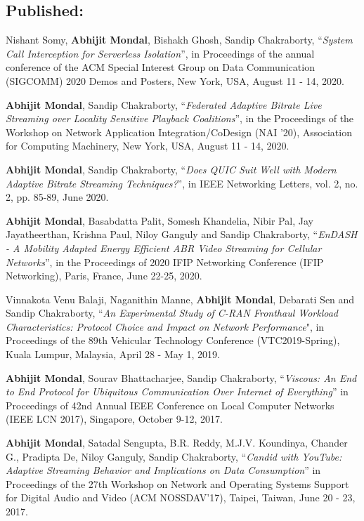 \subsection*{Published:}
\begin{enumerate}[start=1,label={[\arabic*]}]
	\item Nishant Somy, \textbf{Abhijit Mondal}, Bishakh Ghosh, Sandip Chakraborty, ``\textit{System Call Interception for Serverless Isolation}'', in Proceedings of the annual conference of the ACM Special Interest Group on Data Communication (SIGCOMM) 2020 Demos and Posters, New York, USA, August 11 - 14, 2020.
	\item \textbf{Abhijit Mondal}, Sandip Chakraborty, ``\textit{Federated Adaptive Bitrate Live Streaming over Locality Sensitive Playback Coalitions}”, in the Proceedings of the Workshop on Network Application Integration/CoDesign (NAI '20), Association for Computing Machinery, New York, USA, August 11 - 14, 2020. 
	\item \textbf{Abhijit Mondal}, Sandip Chakraborty, ``\textit{Does QUIC Suit Well with Modern Adaptive Bitrate Streaming Techniques?}”, in IEEE Networking Letters, vol. 2, no. 2, pp. 85-89, June 2020.
	\item \textbf{Abhijit Mondal}, Basabdatta Palit, Somesh Khandelia, Nibir Pal, Jay Jayatheerthan, Krishna Paul, Niloy Ganguly and Sandip Chakraborty, ``\textit{EnDASH - A Mobility Adapted Energy Efficient ABR Video Streaming for Cellular Networks}'', in the Proceedings of 2020 IFIP Networking Conference (IFIP Networking), Paris, France, June 22-25, 2020.
	\item Vinnakota Venu Balaji, Naganithin Manne, \textbf{Abhijit Mondal}, Debarati Sen and Sandip Chakraborty, ``\textit{An Experimental Study of C-RAN Fronthaul Workload Characteristics: Protocol Choice and Impact on Network Performance}", in Proceedings of the 89th Vehicular Technology Conference (VTC2019-Spring), Kuala Lumpur, Malaysia, April 28 - May 1, 2019.
	\item \textbf{Abhijit Mondal}, Sourav Bhattacharjee, Sandip Chakraborty, ``\textit{Viscous: An End to End Protocol for Ubiquitous Communication Over Internet of Everything}'' in Proceedings of 42nd Annual IEEE Conference on Local Computer Networks (IEEE LCN 2017), Singapore, October 9-12, 2017.
	\item \textbf{Abhijit Mondal}, Satadal Sengupta, B.R. Reddy, M.J.V. Koundinya, Chander G., Pradipta De, Niloy Ganguly, Sandip Chakraborty, ``\textit{Candid with YouTube: Adaptive Streaming Behavior and Implications on Data Consumption}'' in Proceedings of the 27th Workshop on Network and Operating Systems Support for Digital Audio and Video (ACM NOSSDAV’17), Taipei, Taiwan, June 20 - 23, 2017.
\end{enumerate}